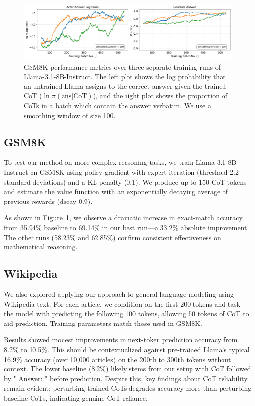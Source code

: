 \documentclass[letterpaper]{article} %
\begin{document}
\begin{figure}[ht]
\centering
    \includegraphics[width=\textwidth]{Figures/llama_combined_metrics_gsm8k.png}
    \caption{GSM8K performance metrics over three separate training runs of Llama-3.1-8B-Instruct. The left plot shows the log probability that an untrained Llama assigns to the correct answer given the trained CoT ($\ln \pi(\text{ans}|\text{CoT})$), and the right plot shows the proportion of CoTs in a batch which contain the answer verbatim. We use a smoothing window of size 100.}
    \label{fig:gsm8k-performance}
\end{figure}

\subsection{GSM8K}
\label{subsec:gsm8k}
To test our method on more complex reasoning tasks, we train Llama-3.1-8B-Instruct on GSM8K using policy gradient with expert iteration (threshold 2.2 standard deviations) and a KL penalty (0.1). We produce up to 150 CoT tokens and estimate the value function with an exponentially decaying average of previous rewards (decay 0.9).

As shown in Figure~\ref{fig:gsm8k-performance}, we observe a dramatic increase in exact-match accuracy from 35.94\% baseline to 69.14\% in our best run—a 33.2\% absolute improvement. The other runs (58.23\% and 62.85\%) confirm consistent effectiveness on mathematical reasoning.

\subsection{Wikipedia}
\label{subsec:wikipedia}

We also explored applying our approach to general language modeling using Wikipedia text. For each article, we condition on the first 200 tokens and task the model with predicting the following 100 tokens, allowing 50 tokens of CoT to aid prediction. Training parameters match those used in GSM8K.

Results showed modest improvements in next-token prediction accuracy from 8.2\% to 10.5\%. This should be contextualized against pre-trained Llama's typical 16.9\% accuracy (over 10,000 articles) on the 200th to 300th tokens without context. The lower baseline (8.2\%) likely stems from our setup with CoT followed by " Answer: " before prediction. Despite this, key findings about CoT reliability remain evident: perturbing trained CoTs degrades accuracy more than perturbing baseline CoTs, indicating genuine CoT reliance.
\end{document}
